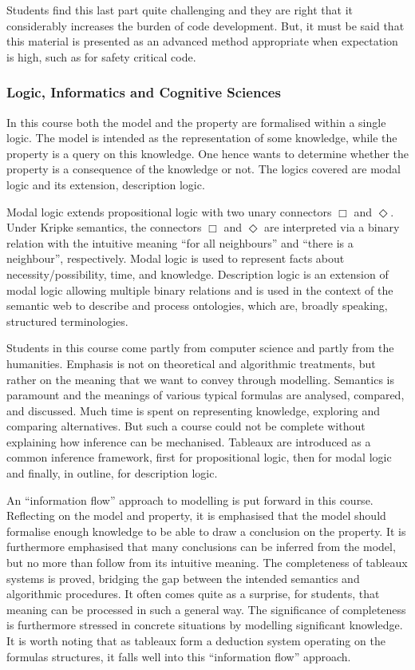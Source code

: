\documentclass[a4paper,UKenglish]{lipics}
\begin{document}
Students find this last part quite challenging and they are right that it considerably increases the burden of code development. But, it must be said that this material is presented as an advanced method appropriate when expectation is high, such as for safety critical code.

\subsubsection{Logic, Informatics and Cognitive Sciences}
In this course both the model and the property are formalised within a single logic. The model is intended as the representation of some knowledge, while the property is a query on this knowledge. One hence wants to determine whether the property is a consequence of the knowledge or not. The logics covered are modal logic and its extension, description logic.

Modal logic extends propositional logic with two unary connectors $\Box$ and $\Diamond$. Under Kripke semantics, the connectors $\Box$ and $\Diamond$ are interpreted via a binary relation with the intuitive meaning ``for all neighbours'' and ``there is a neighbour'', respectively. Modal logic is used to represent facts about necessity/possibility, time, and knowledge. Description logic is an extension of modal logic allowing multiple binary relations and is used in the context of the semantic web to describe and process ontologies, which are, broadly speaking, structured terminologies.

Students in this course come partly from computer science and partly from the humanities. Emphasis is not on theoretical and algorithmic treatments, but rather on the meaning that we want to convey through modelling. Semantics is paramount and the meanings of various typical formulas are analysed, compared, and discussed. Much time is spent on representing knowledge, exploring and comparing alternatives. But such a course could not be complete without explaining how inference can be mechanised. Tableaux are introduced as a common inference framework, first for propositional logic, then for modal logic and finally, in outline, for description logic.

An ``information flow'' approach to modelling is put forward in this course. Reflecting on the model and property, it is emphasised that the model should formalise enough knowledge to be able to draw a conclusion on the property. It is furthermore emphasised that many conclusions can be inferred from the model, but no more than follow from its intuitive meaning. The completeness of tableaux systems is proved, bridging the gap between the intended semantics and algorithmic procedures. It often comes quite as a surprise, for students, that meaning can be processed in such a general way. The significance of completeness is furthermore stressed in concrete situations by modelling significant knowledge. It is worth noting that as tableaux form a deduction system operating on the formulas structures, it falls well into this ``information flow'' approach.
\end{document}
